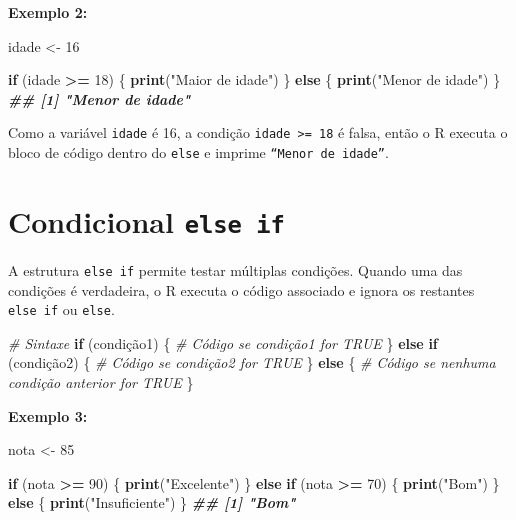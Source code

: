 \documentclass[
]{book}
\newenvironment{Shaded}{\begin{snugshade}}{\end{snugshade}}
\newcommand{\CommentTok}[1]{\textcolor[rgb]{0.56,0.35,0.01}{\textit{#1}}}
\newcommand{\ControlFlowTok}[1]{\textcolor[rgb]{0.13,0.29,0.53}{\textbf{#1}}}
\newcommand{\DecValTok}[1]{\textcolor[rgb]{0.00,0.00,0.81}{#1}}
\newcommand{\DocumentationTok}[1]{\textcolor[rgb]{0.56,0.35,0.01}{\textbf{\textit{#1}}}}
\newcommand{\FunctionTok}[1]{\textcolor[rgb]{0.13,0.29,0.53}{\textbf{#1}}}
\newcommand{\NormalTok}[1]{#1}
\newcommand{\OtherTok}[1]{\textcolor[rgb]{0.56,0.35,0.01}{#1}}
\newcommand{\SpecialCharTok}[1]{\textcolor[rgb]{0.81,0.36,0.00}{\textbf{#1}}}
\newcommand{\StringTok}[1]{\textcolor[rgb]{0.31,0.60,0.02}{#1}}
\begin{document}
\textbf{Exemplo 2:}

\begin{Shaded}
\begin{Highlighting}[]
\NormalTok{idade }\OtherTok{\textless{}{-}} \DecValTok{16}

\ControlFlowTok{if}\NormalTok{ (idade }\SpecialCharTok{\textgreater{}=} \DecValTok{18}\NormalTok{) \{}
      \FunctionTok{print}\NormalTok{(}\StringTok{"Maior de idade"}\NormalTok{)}
\NormalTok{\} }\ControlFlowTok{else}\NormalTok{ \{}
    \FunctionTok{print}\NormalTok{(}\StringTok{"Menor de idade"}\NormalTok{)}
\NormalTok{\}}
\DocumentationTok{\#\# [1] "Menor de idade"}
\end{Highlighting}
\end{Shaded}

Como a variável \texttt{idade} é 16, a condição \texttt{idade\ \textgreater{}=\ 18} é falsa, então o
R executa o bloco de código dentro do \texttt{else} e imprime
\texttt{“Menor\ de\ idade”}.

\section{\texorpdfstring{Condicional \texttt{else\ if}}{Condicional else if}}\label{condicional-else-if}

A estrutura \texttt{else\ if} permite testar múltiplas condições. Quando uma das
condições é verdadeira, o R executa o código associado e ignora os
restantes \texttt{else\ if} ou \texttt{else}.

\begin{Shaded}
\begin{Highlighting}[]
\CommentTok{\# Sintaxe}
\ControlFlowTok{if}\NormalTok{ (condição1) \{}
      \CommentTok{\# Código se condição1 for TRUE}
\NormalTok{\} }\ControlFlowTok{else} \ControlFlowTok{if}\NormalTok{ (condição2) \{}
      \CommentTok{\# Código se condição2 for TRUE}
\NormalTok{\} }\ControlFlowTok{else}\NormalTok{ \{}
      \CommentTok{\# Código se nenhuma condição anterior for TRUE}
\NormalTok{\}}
\end{Highlighting}
\end{Shaded}

\textbf{Exemplo 3:}

\begin{Shaded}
\begin{Highlighting}[]
\NormalTok{nota }\OtherTok{\textless{}{-}} \DecValTok{85}

\ControlFlowTok{if}\NormalTok{ (nota }\SpecialCharTok{\textgreater{}=} \DecValTok{90}\NormalTok{) \{}
  \FunctionTok{print}\NormalTok{(}\StringTok{"Excelente"}\NormalTok{)}
\NormalTok{\} }\ControlFlowTok{else} \ControlFlowTok{if}\NormalTok{ (nota }\SpecialCharTok{\textgreater{}=} \DecValTok{70}\NormalTok{) \{}
  \FunctionTok{print}\NormalTok{(}\StringTok{"Bom"}\NormalTok{)}
\NormalTok{\} }\ControlFlowTok{else}\NormalTok{ \{}
  \FunctionTok{print}\NormalTok{(}\StringTok{"Insuficiente"}\NormalTok{)}
\NormalTok{\}}
\DocumentationTok{\#\# [1] "Bom"}
\end{Highlighting}
\end{Shaded}
\end{document}
